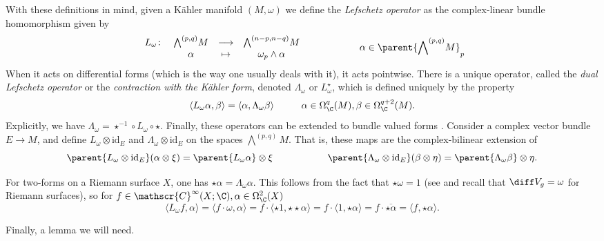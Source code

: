 With these definitions in mind, given a Kähler manifold \((M, \omega)\) we define the \textit{Lefschetz operator} as the complex-linear bundle homomorphism given by 
\[
\begin{array}{cccc}
    L_\omega \colon & {\bigwedge}^{(p,q)} M & \longrightarrow & {\bigwedge}^{(n-p, n-q)} M \\
    & \alpha & \mapsto & \omega_p \wedge \alpha
\end{array}
\hspace{2 cm} \alpha \in \parent{{\bigwedge}^{(p,q)} M}_p 
\]
When it acts on differential forms (which is the way one usually deals with it), it acts pointwise. There is a unique operator, called the \textit{dual Lefschetz operator} or the \textit{contraction with the Kähler form}, denoted \(\Lambda_\omega\) or \(L_\omega^\star\), which is defined uniquely by the property 
\[
\langle L_\omega \alpha, \beta \rangle  = \langle \alpha, \Lambda_\omega\beta \rangle  \hspace{1 cm} \alpha \in \Omega_\C^q(M), \beta \in \Omega_\C^{q+2}(M).
\]
Explicitly, we have \(\Lambda_\omega = \star^{-1} \circ L_\omega \circ \star\). Finally, these operators can be extended to bundle valued forms \parencite{huybrechts2005complex}. Consider a complex vector bundle \(E \to M\), and define \(L_\omega \otimes \mathrm{id}_E\) and \(\Lambda_\omega \otimes \mathrm{id}_E\) on the spaces \(\bigwedge^{(p,q)}M\). That is, these maps are the complex-bilinear extension of 
\[
\parent{L_\omega \otimes \mathrm{id}_E}(\alpha \otimes \xi) = \parent{L_\omega \alpha} \otimes \xi \hspace{2 cm} \parent{\Lambda_\omega \otimes \mathrm{id}_E}(\beta \otimes \eta) = \parent{\Lambda_\omega \beta} \otimes \eta.
\]

\begin{obs} \label{obs_hodgestar_equal_lambda}
    For two-forms on a Riemann surface \(X\), one has \(\star \alpha = \Lambda_\omega \alpha\). This follows from the fact that \(\star \omega=1\) (see \parencite[6.2.1]{munoz2020geometry} and recall that \(\diff V_g=\omega\) for Riemann surfaces), so for \(f \in \mathscr{C}^\infty(X;\C), \alpha \in \Omega^2_\C(X)\)
    \[
    \langle L_\omega f, \alpha\rangle = \langle f \cdot \omega, \alpha\rangle = f\cdot \langle \star 1, \star \star \alpha \rangle = f\cdot \langle 1, \star\alpha \rangle  =  f\cdot \overline{\star \alpha}=\langle f, \star \alpha \rangle.
    \]
\end{obs}

Finally, a lemma we will need.

